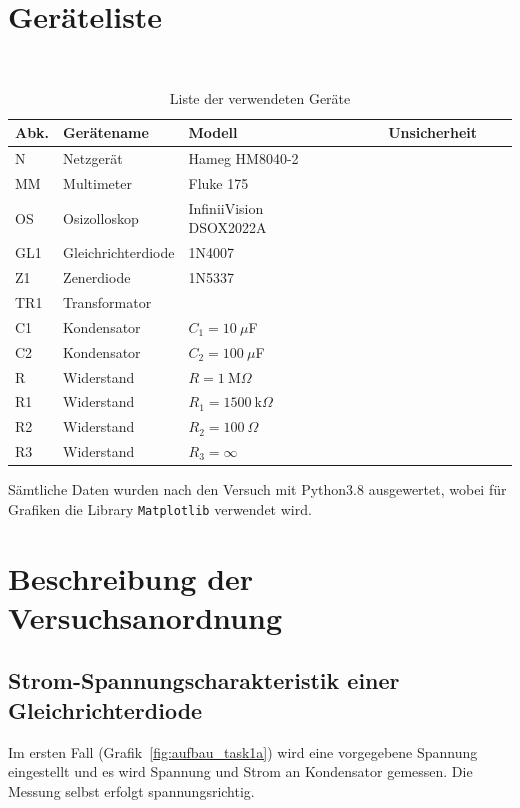 \documentclass{article}
\begin{document}
\section{Geräteliste}

\begin{table}[H]
\caption{Liste der verwendeten Geräte}

~

\begin{tabular}{l|p{2cm}p{3cm}lll}
Abk. & Gerätename    &  Modell  & Unsicherheit\\
\hline
N & Netzgerät & Hameg HM8040-2 \\
MM & Multimeter & Fluke 175 \\
OS & Osizolloskop & InfiniiVision ~~~~~~~~~~~ DSOX2022A \\
GL1 & Gleichrichter\-diode  &  1N4007 \\
Z1 & Zenerdiode  &  1N5337 \\
TR1 & Transformator & \\
C1 & Kondensator & $C_1 = 10~\mu$F \\
C2 & Kondensator & $C_2 = 100~\mu$F \\
R & Widerstand & $R = 1~$M$\Omega$ \\
R1 & Widerstand & $R_1 = 1500~$k$\Omega$ \\
R2 & Widerstand & $R_2 = 100~\Omega$ \\
R3 & Widerstand & $R_3 = \infty$
\end{tabular}
\end{table}

Sämtliche Daten wurden nach den Versuch mit Python3.8 ausgewertet, wobei für Grafiken die Library \texttt{Matplotlib} verwendet wird. 




\section{Beschreibung der Versuchsanordnung}

\subsection{Strom-Spannungscharakteristik einer Gleichrichterdiode}

Im ersten Fall (Grafik~\ref{fig:aufbau_task1a}) wird eine vorgegebene Spannung eingestellt und es wird Spannung und Strom an Kondensator gemessen. Die Messung selbst erfolgt spannungsrichtig.
\end{document}
